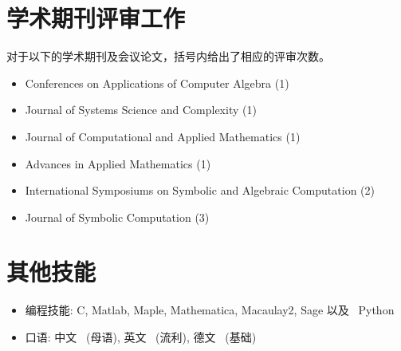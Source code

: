 \documentclass[a4paper,12pt]{article}
\begin{document}
\begin{CJK*}{UTF8}{gbsn}
\section*{\Large 学术期刊评审工作}
对于以下的学术期刊及会议论文，括号内给出了相应的评审次数。
\begin{itemize}
\item Conferences on Applications of Computer Algebra (1)
\item Journal of Systems Science and Complexity (1)
 \item Journal of Computational and Applied Mathematics (1)
 \item Advances in Applied Mathematics (1)
 \item International Symposiums on Symbolic and Algebraic Computation (2)
 \item Journal of Symbolic Computation (3)
\end{itemize}

\section*{\Large{其他技能}}
\begin{itemize}
 \item 编程技能: C, Matlab, Maple, Mathematica, Macaulay2, Sage 以及 \ Python
 \item 口语: 中文 \ (母语), 英文 \ (流利), 德文 \ (基础)
\end{itemize}


\end{CJK*}
\end{document}
